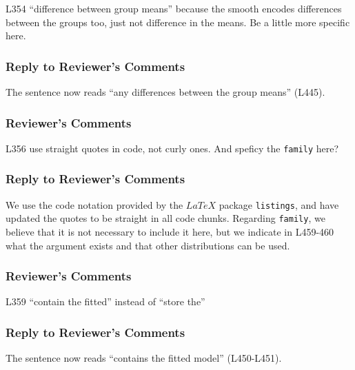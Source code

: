 \documentclass[
]{article}
\newcommand{\passthrough}[1]{#1}
\begin{document}
L354 ``difference between group means'' because the smooth encodes differences between the groups too, just not difference in the means. Be a little more specific here.

\hypertarget{section-26}{%
\subsubsection{\texorpdfstring{\textcolor{reviewersblue} {Reply to Reviewer's Comments}}{}}\label{section-26}}

The sentence now reads ``any differences between the group means'' (L445).

\hypertarget{reviewers-comments-26}{%
\subsubsection{Reviewer's Comments}\label{reviewers-comments-26}}

L356 use straight quotes in code, not curly ones. And speficy the \passthrough{\lstinline!family!} here?

\hypertarget{section-27}{%
\subsubsection{\texorpdfstring{\textcolor{reviewersblue} {Reply to Reviewer's Comments}}{}}\label{section-27}}

We use the code notation provided by the \(LaTeX\) package \passthrough{\lstinline!listings!}, and have updated the quotes to be straight in all code chunks. Regarding \passthrough{\lstinline!family!}, we believe that it is not necessary to include it here, but we indicate in L459-460 what the argument exists and that other distributions can be used.

\hypertarget{reviewers-comments-27}{%
\subsubsection{Reviewer's Comments}\label{reviewers-comments-27}}

L359 ``contain the fitted'' instead of ``store the''

\hypertarget{section-28}{%
\subsubsection{\texorpdfstring{\textcolor{reviewersblue} {Reply to Reviewer's Comments}}{}}\label{section-28}}

The sentence now reads ``contains the fitted model'' (L450-L451).
\end{document}
